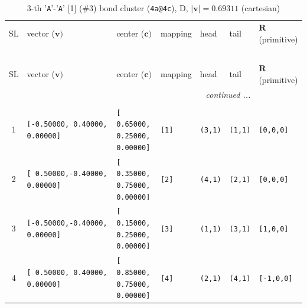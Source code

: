 \documentclass[fleqn,10pt,landscape]{jsarticle}
\begin{document}
\begin{longtable}[l]{cllllll}
\captionsetup{justification=raggedright, singlelinecheck=off}
\caption{3-th '\texttt{A}'-'\texttt{A}' [1] (\#3) bond cluster (\texttt{4a@4c}), D, $|\bm{v}|=0.69311$ (cartesian)}
 \\
 \hline \hline
SL & vector ($\bm{v})$ & center ($\bm{c})$ & mapping & head & tail & $\bm{R}$ (primitive) \\ \hline \endfirsthead

\multicolumn{6}{l}{\tablename\ \thetable{}} \\
 \hline \hline
SL & vector ($\bm{v})$ & center ($\bm{c})$ & mapping & head & tail & $\bm{R}$ (primitive) \\ \hline \endhead

 \hline \hline
\multicolumn{6}{r}{\footnotesize\it continued ...} \\ \endfoot

 \hline \hline
\multicolumn{6}{r}{} \\ \endlastfoot

1 & \texttt{[-0.50000, 0.40000, 0.00000]} & \texttt{[ 0.65000, 0.25000, 0.00000]} & \texttt{[1]} & \texttt{(3,1)} & \texttt{(1,1)} & \texttt{[0,0,0]} \\ \hline
2 & \texttt{[ 0.50000,-0.40000, 0.00000]} & \texttt{[ 0.35000, 0.75000, 0.00000]} & \texttt{[2]} & \texttt{(4,1)} & \texttt{(2,1)} & \texttt{[0,0,0]} \\ \hline
3 & \texttt{[-0.50000,-0.40000, 0.00000]} & \texttt{[ 0.15000, 0.25000, 0.00000]} & \texttt{[3]} & \texttt{(1,1)} & \texttt{(3,1)} & \texttt{[1,0,0]} \\ \hline
4 & \texttt{[ 0.50000, 0.40000, 0.00000]} & \texttt{[ 0.85000, 0.75000, 0.00000]} & \texttt{[4]} & \texttt{(2,1)} & \texttt{(4,1)} & \texttt{[-1,0,0]} \\
\end{longtable}
\end{document}
